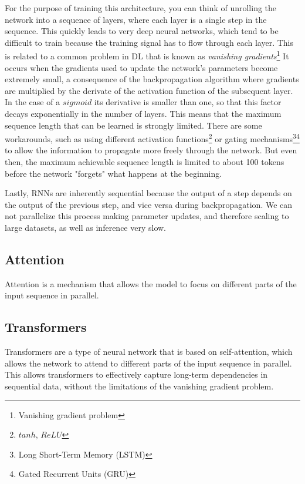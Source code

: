 For the purpose of training this architecture, you can think of unrolling the network into a sequence of layers, where each layer is a single step in the sequence.
This quickly leads to very deep neural networks, which tend to be difficult to train because the training signal has to flow through each layer.
This is related to a common problem in DL that is known as \textit{vanishing gradients}\footnote{Vanishing gradient problem}
It occurs when the gradients used to update the network's parameters become extremely small, a consequence of the backpropagation algorithm where gradients are multiplied by the derivate of the activation function of the subsequent layer.
In the case of a $sigmoid$ its derivative is smaller than one, so that this factor decays exponentially in the number of layers.
This means that the maximum sequence length that can be learned is strongly limited.
There are some workarounds, such as using different activation functions\footnote{$tanh$, $ReLU$} or gating mechanisms\footnote{Long Short-Term Memory (LSTM)}\footnote{Gated Recurrent Units (GRU)} to allow the information to propagate more freely through the network.
But even then, the maximum achievable sequence length is limited to about 100 tokens before the network "forgets" what happens at the beginning.

Lastly, RNNs are inherently sequential because the output of a step depends on the output of the previous step, and vice versa during backpropagation.
We can not parallelize this process making parameter updates, and therefore scaling to large datasets, as well as inference very slow.

\subsection{Attention}
Attention is a mechanism that allows the model to focus on different parts of the input sequence in parallel.

\subsection{Transformers}
Transformers are a type of neural network that is based on self-attention, which allows the network to attend to different parts of the input sequence in parallel.
This allows transformers to effectively capture long-term dependencies in sequential data, without the limitations of the vanishing gradient problem.

